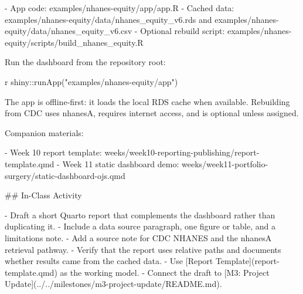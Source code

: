 \documentclass[
  letterpaper,
  DIV=11,
  numbers=noendperiod,
  oneside]{scrreprt}
\newenvironment{Shaded}{\begin{snugshade}}{\end{snugshade}}
\newcommand{\CommentTok}[1]{\textcolor[rgb]{0.37,0.37,0.37}{#1}}
\newcommand{\FunctionTok}[1]{\textcolor[rgb]{0.28,0.35,0.67}{#1}}
\newcommand{\InformationTok}[1]{\textcolor[rgb]{0.37,0.37,0.37}{#1}}
\newcommand{\NormalTok}[1]{\textcolor[rgb]{0.00,0.23,0.31}{#1}}
\newcommand{\OtherTok}[1]{\textcolor[rgb]{0.00,0.23,0.31}{#1}}
\newcommand{\SpecialCharTok}[1]{\textcolor[rgb]{0.37,0.37,0.37}{#1}}
\newcommand{\SpecialStringTok}[1]{\textcolor[rgb]{0.13,0.47,0.30}{#1}}
\newcommand{\StringTok}[1]{\textcolor[rgb]{0.13,0.47,0.30}{#1}}
\begin{document}
\begin{Shaded}
\begin{Highlighting}[numbers=left,,]
\SpecialStringTok{{-} }\NormalTok{App code: }\InformationTok{\textasciigrave{}examples/nhanes{-}equity/app/app.R\textasciigrave{}}
\SpecialStringTok{{-} }\NormalTok{Cached data: }\InformationTok{\textasciigrave{}examples/nhanes{-}equity/data/nhanes\_equity\_v6.rds\textasciigrave{}}\NormalTok{ and }\InformationTok{\textasciigrave{}examples/nhanes{-}equity/data/nhanes\_equity\_v6.csv\textasciigrave{}}
\SpecialStringTok{{-} }\NormalTok{Optional rebuild script: }\InformationTok{\textasciigrave{}examples/nhanes{-}equity/scripts/build\_nhanes\_equity.R\textasciigrave{}}

\NormalTok{Run the dashboard from the repository root:}

\InformationTok{\textasciigrave{}\textasciigrave{}\textasciigrave{}r}
\NormalTok{shiny}\SpecialCharTok{::}\FunctionTok{runApp}\NormalTok{(}\StringTok{"examples/nhanes{-}equity/app"}\NormalTok{)}
\InformationTok{\textasciigrave{}\textasciigrave{}\textasciigrave{}}

\NormalTok{The app is offline{-}first: it loads the local RDS cache when available. Rebuilding from CDC uses }\InformationTok{\textasciigrave{}nhanesA\textasciigrave{}}\NormalTok{, requires internet access, and is optional unless assigned.}

\NormalTok{Companion materials:}

\SpecialStringTok{{-} }\NormalTok{Week 10 report template: }\InformationTok{\textasciigrave{}weeks/week10{-}reporting{-}publishing/report{-}template.qmd\textasciigrave{}}
\SpecialStringTok{{-} }\NormalTok{Week 11 static dashboard demo: }\InformationTok{\textasciigrave{}weeks/week11{-}portfolio{-}surgery/static{-}dashboard{-}ojs.qmd\textasciigrave{}}


\FunctionTok{\#\# In{-}Class Activity}

\SpecialStringTok{{-} }\NormalTok{Draft a short Quarto report that complements the dashboard rather than duplicating it.}
\SpecialStringTok{{-} }\NormalTok{Include a data source paragraph, one figure or table, and a limitations note.}
\SpecialStringTok{{-} }\NormalTok{Add a source note for CDC NHANES and the }\InformationTok{\textasciigrave{}nhanesA\textasciigrave{}}\NormalTok{ retrieval pathway.}
\SpecialStringTok{{-} }\NormalTok{Verify that the report uses relative paths and documents whether results came from the cached data.}
\SpecialStringTok{{-} }\NormalTok{Use }\CommentTok{[}\OtherTok{Report Template}\CommentTok{](report{-}template.qmd)}\NormalTok{ as the working model.}
\SpecialStringTok{{-} }\NormalTok{Connect the draft to }\CommentTok{[}\OtherTok{M3: Project Update}\CommentTok{](../../milestones/m3{-}project{-}update/README.md)}\NormalTok{.}


\end{Highlighting}
\end{Shaded}
\end{document}

